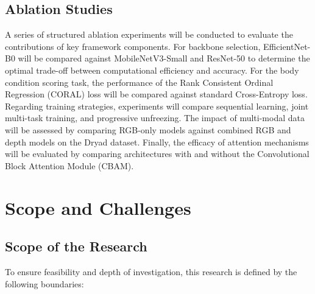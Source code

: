 \subsection{Ablation Studies}

A series of structured ablation experiments will be conducted to evaluate the contributions of key framework components. For backbone selection, EfficientNet-B0 will be compared against MobileNetV3-Small and ResNet-50 to determine the optimal trade-off between computational efficiency and accuracy. For the body condition scoring task, the performance of the Rank Consistent Ordinal Regression (CORAL) loss will be compared against standard Cross-Entropy loss. Regarding training strategies, experiments will compare sequential learning, joint multi-task training, and progressive unfreezing. The impact of multi-modal data will be assessed by comparing RGB-only models against combined RGB and depth models on the Dryad dataset. Finally, the efficacy of attention mechanisms will be evaluated by comparing architectures with and without the Convolutional Block Attention Module (CBAM).


\section{Scope and Challenges}

\subsection{Scope of the Research}

To ensure feasibility and depth of investigation, this research is defined by the following boundaries:

